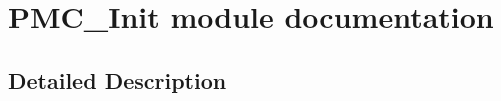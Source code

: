 \hypertarget{group___p_m_c___init__module}{}\section{P\+M\+C\+\_\+\+Init module documentation}
\label{group___p_m_c___init__module}


\subsection{Detailed Description}
